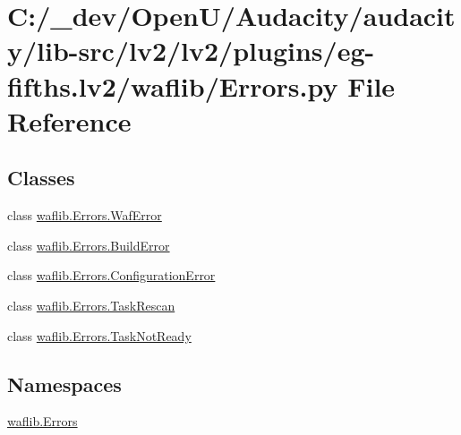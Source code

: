 \hypertarget{lv2_2plugins_2eg-fifths_8lv2_2waflib_2_errors_8py}{}\section{C\+:/\+\_\+dev/\+Open\+U/\+Audacity/audacity/lib-\/src/lv2/lv2/plugins/eg-\/fifths.lv2/waflib/\+Errors.py File Reference}
\label{lv2_2plugins_2eg-fifths_8lv2_2waflib_2_errors_8py}
\subsection*{Classes}
\begin{DoxyCompactItemize}
\item 
class \hyperlink{classwaflib_1_1_errors_1_1_waf_error}{waflib.\+Errors.\+Waf\+Error}
\item 
class \hyperlink{classwaflib_1_1_errors_1_1_build_error}{waflib.\+Errors.\+Build\+Error}
\item 
class \hyperlink{classwaflib_1_1_errors_1_1_configuration_error}{waflib.\+Errors.\+Configuration\+Error}
\item 
class \hyperlink{classwaflib_1_1_errors_1_1_task_rescan}{waflib.\+Errors.\+Task\+Rescan}
\item 
class \hyperlink{classwaflib_1_1_errors_1_1_task_not_ready}{waflib.\+Errors.\+Task\+Not\+Ready}
\end{DoxyCompactItemize}
\subsection*{Namespaces}
\begin{DoxyCompactItemize}
\item 
 \hyperlink{namespacewaflib_1_1_errors}{waflib.\+Errors}
\end{DoxyCompactItemize}
